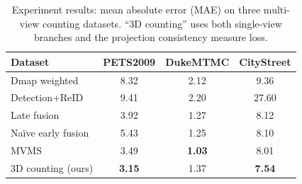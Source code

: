 \documentclass[letterpaper]{article}
\newcommand{\citep}{\cite}
\begin{document}
\begin{table}
\small
\centering
\begin{tabular}{l|c|c|c}
\hline
    Dataset        & PETS2009      &DukeMTMC    &CityStreet   \\
\hline
    Dmap weighted  & 8.32                                      & 2.12                             & 9.36   \\
    Detection+ReID & 9.41                                       & 2.20                             & 27.60   \\
\hline
    Late fusion \citep{zhang2019wide}         & 3.92             & 1.27                             & 8.12    \\
    Na\"ive early fusion \citep{zhang2019wide} & 5.43             & 1.25                             & 8.10   \\
    MVMS \citep{zhang2019wide}                  &3.49              &\textbf{1.03}                     & 8.01   \\
\hline
    3D counting (ours)                        &\textbf{3.15}        &1.37                           & \textbf{7.54} \\
\hline
\end{tabular}
\caption{Experiment results: mean absolute error (MAE) on three multi-view counting datasets. ``3D counting'' uses both single-view branches and the projection consistency measure loss.}
\label{table:results}
\end{table}
\end{document}
